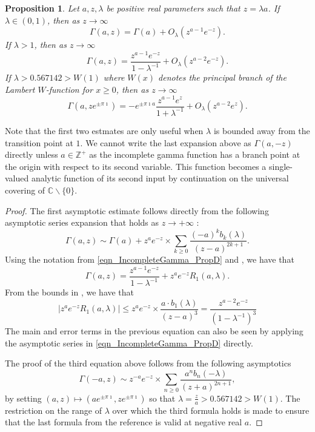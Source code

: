 \documentclass[11pt,reqno,a4letter]{article}
\numberwithin{figure}{section}
\numberwithin{table}{section}
\theoremstyle{plain}
\newtheorem{prop}[theorem]{Proposition}
\numberwithin{theorem}{section}
\theoremstyle{definition}
\begin{document}
\begin{prop}
\label{prop_IncGammaLambdaTypeBounds_v1}
Let $a,z,\lambda$ be positive real parameters such that $z=\lambda a$. 
If $\lambda \in (0, 1)$, then as $z \rightarrow \infty$ 
\[
\Gamma(a, z) = \Gamma(a) + O_{\lambda}\left(z^{a-1} e^{-z}\right). 
\]
If $\lambda > 1$, then as 
$z \rightarrow \infty$ 
\[
\Gamma(a, z) = \frac{z^{a-1} e^{-z}}{1-\lambda^{-1}} + O_{\lambda}\left(z^{a-2} e^{-z}\right). 
\]
If $\lambda > 0.567142 > W(1)$ where $W(x)$ denotes the principal branch of the 
Lambert $W$-function for $x \geq 0$, 
then as $z \rightarrow \infty$ 
\[
\Gamma(a, z e^{\pm\pi\imath}) = -e^{\pm \pi\imath a} \frac{z^{a-1} e^{z}}{1 + \lambda^{-1}} + 
     O_{\lambda}\left(z^{a-2} e^{z}\right). 
\]
\end{prop}
Note that the first two estmates are only useful when $\lambda$ is bounded away from the 
transition point at $1$. 
We cannot write the last expansion above 
as $\Gamma(a, -z)$ directly unless $a \in \mathbb{Z}^{+}$ 
as the incomplete gamma function 
has a branch point at the origin with respect to its second variable. 
This function becomes a single-valued 
analytic function of its second input by continuation 
on the universal covering of $\mathbb{C} \mathbin{\backslash} \{0\}$. 
\begin{proof}
The first asymptotic estimate follows directly from the following 
asymptotic series expansion that holds as $z \rightarrow +\infty$ 
\cite[Eq.\ (2.1)]{NEMES2019}: 
\[
\Gamma(a, z) \sim \Gamma(a) + z^a e^{-z} \times \sum_{k \geq 0} 
     \frac{(-a)^k b_k(\lambda)}{(z-a)^{2k+1}}. 
\]
Using the notation from \eqref{eqn_IncompleteGamma_PropD} and \cite{NEMES2016}, 
we have that 
\[
\Gamma(a, z) = \frac{z^{a-1} e^{-z}}{1-\lambda^{-1}} + z^{a} e^{-z} R_1(a, \lambda). 
\]
From the bounds in \cite[\S 3.1]{NEMES2016}, we have that 
\[
\left\lvert z^{a} e^{-z} R_1(a, \lambda) \right\rvert \leq 
     z^a e^{-z} \times \frac{a \cdot b_1(\lambda)}{(z-a)^{3}} = 
     \frac{z^{a-2} e^{-z}}{(1-\lambda^{-1})^{3}}
\]
The main and error terms in the previous equation can also be 
seen by applying the asymptotic series in 
\eqref{eqn_IncompleteGamma_PropD} directly. 

The proof of the third equation above follows from the following asymptotics 
\cite[Eq.\ (1.1)]{NEMES2015C}
\[
\Gamma(-a, z) \sim z^{-a} e^{-z} \times \sum_{n \geq 0} \frac{a^n b_n(-\lambda)}{(z+a)^{2n+1}}, 
\]
by setting $(a, z) \mapsto \left(a e^{\pm \pi\imath}, z e^{\pm \pi\imath}\right)$ so that 
$\lambda = \frac{z}{a} > 0.567142 > W(1)$. 
The restriction on the range of $\lambda$ over which the third formula holds is made to ensure that 
the last formula from the reference is valid at negative real $a$. 
\end{proof}
\end{document}
